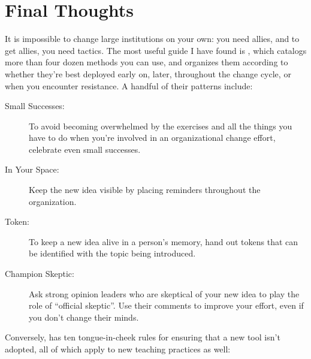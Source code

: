 \section{Final Thoughts}\label{s:partner-final}

It is impossible to change large institutions on your own: you need
allies, and to get allies, you need tactics.  The most useful guide I
have found is \cite{Mann2015}, which catalogs more than four dozen
methods you can use, and organizes them according to whether they're
best deployed early on, later, throughout the change cycle, or when
you encounter resistance.  A handful of their patterns include:

\begin{description}

\item[Small Successes:] To avoid becoming overwhelmed by the
  exercises and all the things you have to do when you're involved in
  an organizational change effort, celebrate even small successes.

\item[In Your Space:] Keep the new idea visible by placing reminders
  throughout the organization.

\item[Token:] To keep a new idea alive in a person's memory, hand out
  tokens that can be identified with the topic being introduced.

\item[Champion Skeptic:] Ask strong opinion leaders who are skeptical
  of your new idea to play the role of ``official skeptic''.  Use
  their comments to improve your effort, even if you don't change
  their minds.
  
\end{description}

Conversely, \cite{Farm2006} has ten tongue-in-cheek rules for ensuring
that a new tool isn't adopted, all of which apply to new teaching
practices as well:

